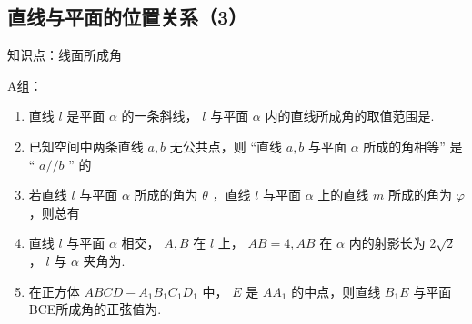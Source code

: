 \clearpage

\subsection*{直线与平面的位置关系（3）}

知识点：线面所成角

A组：
\begin{enumerate}
\item 直线 ${l}$ 是平面 ${\alpha }$ 的一条斜线， ${l}$ 与平面 ${\alpha }$ 内的直线所成角的取值范围是.

\item 已知空间中两条直线 ${a},{b}$ 无公共点，则 “直线 ${a},{b}$ 与平面 ${\alpha }$ 所成的角相等” 是 “ ${a}//{b}$ ” 的

\item 若直线 ${l}$ 与平面 ${\alpha }$ 所成的角为 ${\theta }$ ，直线 ${l}$ 与平面 ${\alpha }$ 上的直线 ${m}$ 所成的角为 ${\varphi }$ ，则总有 

\item 直线 $l$ 与平面 ${\alpha }$ 相交， $A,B$ 在 $l$ 上， ${{AB}} = {4},{{AB}}$ 在 ${\alpha }$ 内的射影长为 $2\sqrt{2}$ ， ${l}$ 与 ${\alpha }$ 夹角为.

\item 在正方体 ${{ABCD}} - {{A}}_{1}{{B}}_{1}{{C}}_{1}{{D}}_{1}$ 中， $E$ 是 ${A}{{A}}_{1}$ 的中点，则直线 ${{B}}_{1}{E}$ 与平面 BCE所成角的正弦值为.
    
\end{enumerate}


